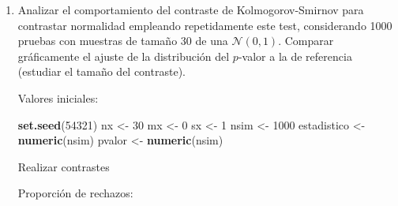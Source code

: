 \documentclass[
]{book}
\newenvironment{Shaded}{\begin{snugshade}}{\end{snugshade}}
\newcommand{\CharTok}[1]{\textcolor[rgb]{0.31,0.60,0.02}{#1}}
\newcommand{\ControlFlowTok}[1]{\textcolor[rgb]{0.13,0.29,0.53}{\textbf{#1}}}
\newcommand{\DecValTok}[1]{\textcolor[rgb]{0.00,0.00,0.81}{#1}}
\newcommand{\FloatTok}[1]{\textcolor[rgb]{0.00,0.00,0.81}{#1}}
\newcommand{\KeywordTok}[1]{\textcolor[rgb]{0.13,0.29,0.53}{\textbf{#1}}}
\newcommand{\NormalTok}[1]{#1}
\newcommand{\OperatorTok}[1]{\textcolor[rgb]{0.81,0.36,0.00}{\textbf{#1}}}
\newcommand{\StringTok}[1]{\textcolor[rgb]{0.31,0.60,0.02}{#1}}
\theoremstyle{break}
\theoremstyle{definition}
\theoremstyle{definition}
\theoremstyle{definition}
\theoremstyle{remark}
\begin{document}
\begin{enumerate}
\def\labelenumi{\alph{enumi})}
\item
  Analizar el comportamiento del contraste de Kolmogorov-Smirnov
  para contrastar normalidad empleando repetidamente este test,
  considerando 1000 pruebas con muestras de tamaño 30 de
  una \(\mathcal{N}(0,1)\). Comparar gráficamente el ajuste
  de la distribución del \(p\)-valor a la de referencia
  (estudiar el tamaño del contraste).

  Valores iniciales:

\begin{Shaded}
\begin{Highlighting}[]
\KeywordTok{set.seed}\NormalTok{(}\DecValTok{54321}\NormalTok{)}
\NormalTok{nx <-}\StringTok{ }\DecValTok{30}
\NormalTok{mx <-}\StringTok{ }\DecValTok{0}
\NormalTok{sx <-}\StringTok{ }\DecValTok{1}
\NormalTok{nsim <-}\StringTok{ }\DecValTok{1000}
\NormalTok{estadistico <-}\StringTok{ }\KeywordTok{numeric}\NormalTok{(nsim)}
\NormalTok{pvalor <-}\StringTok{ }\KeywordTok{numeric}\NormalTok{(nsim)}
\end{Highlighting}
\end{Shaded}

  Realizar contrastes

\begin{Shaded}
\end{Shaded}

  Proporción de rechazos:

\begin{Shaded}
\end{Shaded}


\end{enumerate}
\end{document}
